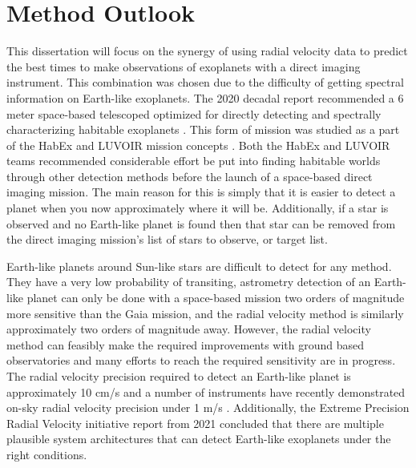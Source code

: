 \section{Method Outlook}
\label{sec:EPRV_HWO}

This dissertation will focus on the synergy of using radial velocity data to
predict the best times to make observations of exoplanets with a direct imaging
instrument. This combination was chosen due to the difficulty of getting
spectral information on Earth-like exoplanets. The 2020 decadal report
recommended a 6 meter space-based telescoped optimized for directly detecting
and spectrally characterizing habitable exoplanets
\citep{nationalacademiesofsciencesPathwaysDiscoveryAstronomy2021}. This form of
mission was studied as a part of the HabEx and LUVOIR mission concepts
\citep{gaudiHabitableExoplanetObservatory2020,TheLUVOIRTeam2019}. Both the
HabEx and LUVOIR teams recommended considerable effort be put into finding
habitable worlds through other detection methods before the launch of a
space-based direct imaging mission. The main reason for this is simply that it
is easier to detect a planet when you now approximately where it will be.
Additionally, if a star is observed and no Earth-like planet is found then
that star can be removed from the direct imaging mission's list of stars
to observe, or target list. 

Earth-like planets around Sun-like stars are difficult to detect for any
method. They have a very low probability of transiting, astrometry detection of
an Earth-like planet can only be done with a space-based mission two orders of
magnitude more sensitive than the Gaia mission, and the radial velocity method
is similarly approximately two orders of magnitude
away\citep{gaudiHabitableExoplanetObservatory2020}. However, the radial
velocity method can feasibly make the required improvements with ground based
observatories and many efforts to reach the required sensitivity are in
progress\citep{Fischer2016a}. The radial velocity precision required to detect
an Earth-like planet is approximately 10 cm/s and a number of instruments have
recently demonstrated on-sky radial velocity precision under 1 m/s
\citep{maroonx2021, guptaTargetPrioritization2021,Pepe2021}. Additionally, the
Extreme Precision Radial Velocity initiative report from 2021 concluded that
there are multiple plausible system architectures that can detect Earth-like
exoplanets under the right conditions\citep{Crass2021}.


